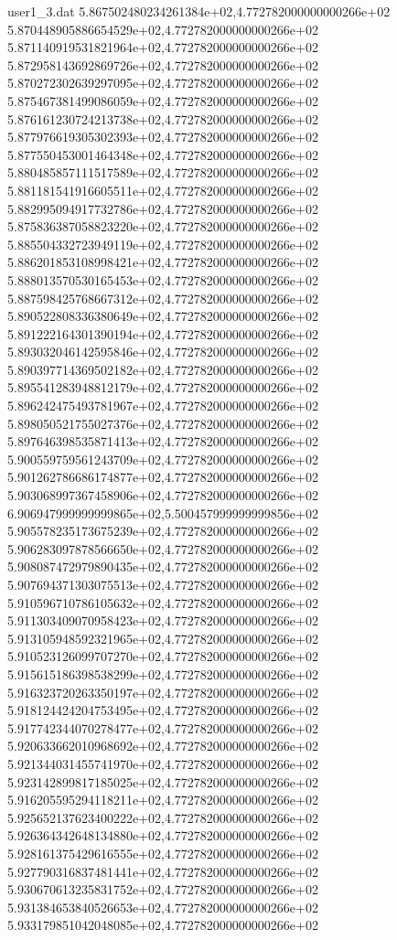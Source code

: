 \begin{filecontents}{user1_3.dat}
5.867502480234261384e+02,4.772782000000000266e+02
5.870448905886654529e+02,4.772782000000000266e+02
5.871140919531821964e+02,4.772782000000000266e+02
5.872958143692869726e+02,4.772782000000000266e+02
5.870272302639297095e+02,4.772782000000000266e+02
5.875467381499086059e+02,4.772782000000000266e+02
5.876161230724213738e+02,4.772782000000000266e+02
5.877976619305302393e+02,4.772782000000000266e+02
5.877550453001464348e+02,4.772782000000000266e+02
5.880485857111517589e+02,4.772782000000000266e+02
5.881181541916605511e+02,4.772782000000000266e+02
5.882995094917732786e+02,4.772782000000000266e+02
5.875836387058823220e+02,4.772782000000000266e+02
5.885504332723949119e+02,4.772782000000000266e+02
5.886201853108998421e+02,4.772782000000000266e+02
5.888013570530165453e+02,4.772782000000000266e+02
5.887598425768667312e+02,4.772782000000000266e+02
5.890522808336380649e+02,4.772782000000000266e+02
5.891222164301390194e+02,4.772782000000000266e+02
5.893032046142595846e+02,4.772782000000000266e+02
5.890397714369502182e+02,4.772782000000000266e+02
5.895541283948812179e+02,4.772782000000000266e+02
5.896242475493781967e+02,4.772782000000000266e+02
5.898050521755027376e+02,4.772782000000000266e+02
5.897646398535871413e+02,4.772782000000000266e+02
5.900559759561243709e+02,4.772782000000000266e+02
5.901262786686174877e+02,4.772782000000000266e+02
5.903068997367458906e+02,4.772782000000000266e+02
6.906947999999999865e+02,5.500457999999999856e+02
5.905578235173675239e+02,4.772782000000000266e+02
5.906283097878566650e+02,4.772782000000000266e+02
5.908087472979890435e+02,4.772782000000000266e+02
5.907694371303075513e+02,4.772782000000000266e+02
5.910596710786105632e+02,4.772782000000000266e+02
5.911303409070958423e+02,4.772782000000000266e+02
5.913105948592321965e+02,4.772782000000000266e+02
5.910523126099707270e+02,4.772782000000000266e+02
5.915615186398538299e+02,4.772782000000000266e+02
5.916323720263350197e+02,4.772782000000000266e+02
5.918124424204753495e+02,4.772782000000000266e+02
5.917742344070278477e+02,4.772782000000000266e+02
5.920633662010968692e+02,4.772782000000000266e+02
5.921344031455741970e+02,4.772782000000000266e+02
5.923142899817185025e+02,4.772782000000000266e+02
5.916205595294118211e+02,4.772782000000000266e+02
5.925652137623400222e+02,4.772782000000000266e+02
5.926364342648134880e+02,4.772782000000000266e+02
5.928161375429616555e+02,4.772782000000000266e+02
5.927790316837481441e+02,4.772782000000000266e+02
5.930670613235831752e+02,4.772782000000000266e+02
5.931384653840526653e+02,4.772782000000000266e+02
5.933179851042048085e+02,4.772782000000000266e+02

\end{filecontents}
